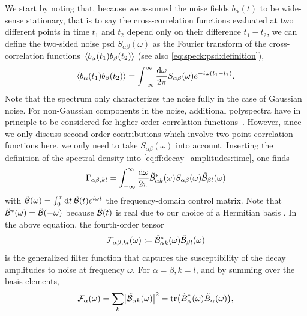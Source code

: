 We start by noting that, because we assumed the noise fields $b_\alpha(t)$ to be wide-sense stationary, that is to say the cross-correlation functions evaluated at two different points in time $t_1$ and $t_2$ depend only on their difference $t_1 - t_2$, we can define the two-sided noise \gls{psd} $S_{\alpha\beta}(\omega)$ as the Fourier transform of the cross-correlation functions $\expval*{b_\alpha(t_1) b_\beta(t_2)}$ (see also \cref{eq:speck:psd:definition}),
\begin{equation}\label{eq:ff:spectral_density}
    \expval{b_\alpha(t_1) b_{\beta}(t_2)} = \int_{-\infty}^{\infty}\frac{\dd{\omega}}{2\pi} S_{\alpha\beta}(\omega)e^{-i\omega (t_1 - t_2)}.
\end{equation}
Note that the spectrum only characterizes the noise fully in the case of Gaussian noise.
For non-Gaussian components in the noise, additional polyspectra have in principle to be considered for higher-order correlation functions~\cite{Norris2016}.
However, since we only discuss second-order contributions which involve two-point correlation functions here, we only need to take $S_{\alpha\beta}(\omega)$ into account.
Inserting the definition of the spectral density into \cref{eq:ff:decay_amplitudes:time}, one finds
\begin{equation}\label{eq:ff:decay_amplitudes:freq}
    \Gamma_{\alpha\beta,kl} = \int_{-\infty}^{\infty}\frac{\dd{\omega}}{2\pi}\tilde{\mathcal{B}}^\ast_{\alpha k}(\omega)S_{\alpha\beta}(\omega)\tilde{\mathcal{B}}_{\beta l}(\omega)
\end{equation}
with $\tilde{\mathcal{B}}(\omega) = \int_0^\tau\dd{t}\tilde{\mathcal{B}}(t)e^{i\omega t}$ the frequency-domain control matrix.
Note that $\tilde{\mathcal{B}}^\ast(\omega) = \tilde{\mathcal{B}}(-\omega)$ because $\tilde{\mathcal{B}}(t)$ is real due to our choice of a Hermitian basis \basis.
In the above equation, the fourth-order tensor
\begin{equation}\label{eq:ff:filter_function:generalized}
    \mathcal{F}_{\alpha\beta,kl}(\omega)\coloneqq\tilde{\mathcal{B}}^\ast_{\alpha k}(\omega)\tilde{\mathcal{B}}_{\beta l}(\omega)
\end{equation}
is the generalized filter function that captures the susceptibility of the decay amplitudes to noise at frequency $\omega$.
For $\alpha = \beta, k = l$, and by summing over the basis elements,
\begin{equation}\label{eq:ff:filter_function:fidelity}
    \mathcal{F}_{\alpha}(\omega) = \sum_k\bigl\lvert\tilde{\mathcal{B}}_{\alpha k}(\omega)\bigr\rvert^2 = \tr(\tilde{B}_\alpha^\dagger(\omega)\tilde{B}_\alpha(\omega)),
\end{equation}
